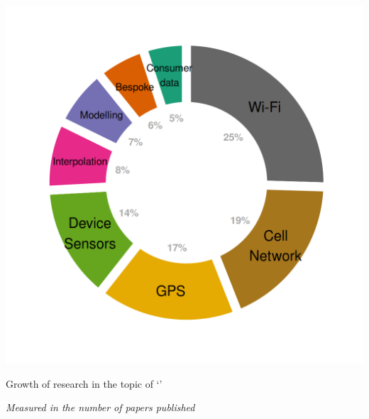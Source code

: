 \begin{marginfigure}
  \includegraphics[trim={1.1cm 1cm 1cm 1cm},clip]{images/literature-technology.png}
  \caption{Growth of research in the topic of `'}
  \label{figure:literature:timeline}
  \noindent\fontsize{7}{7}\textit{Measured in the number of papers published}
\end{marginfigure}


